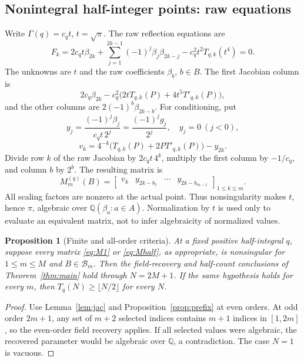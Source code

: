 \documentclass[11pt,a4paper]{article}
\newtheorem{proposition}[theorem]{Proposition}
\theoremstyle{definition}\newtheorem{definition}[theorem]{Definition}
\theoremstyle{remark}\newtheorem{remark}[theorem]{Remark}
\newcommand{\Q}{\mathbb Q}\newcommand{\Qb}{\overline{\mathbb Q}}
\begin{document}
\subsection{Nonintegral half-integer points: raw equations}
Write $\Gamma(q)=c_qt$, $t=\sqrt\pi$. The raw reflection equations are
\begin{equation}\label{eq:halfraw}
F_k=2c_qt\beta_{2k}+\sum_{j=1}^{2k-1}(-1)^j\beta_j\beta_{2k-j}
-c_q^2t^2T_{q,k}(t^4)=0.
\end{equation}
The unknowns are $t$ and the raw coefficients $\beta_b$, $b\in B$. The first Jacobian column is
\[
2c_q\beta_{2k}-c_q^2\bigl(2tT_{q,k}(P)+4t^5T'_{q,k}(P)\bigr),
\]
and the other columns are $2(-1)^b\beta_{2k-b}$. For conditioning, put
\[
y_j=\frac{(-1)^j\beta_j}{c_qt\,2^j}=\frac{(-1)^jg_j}{2^j},\quad
 y_j=0\ (j<0),
\]
\begin{equation}\label{eq:vkhalf}
v_k=4^{-k}\bigl(T_{q,k}(P)+2PT'_{q,k}(P)\bigr)-y_{2k}.
\end{equation}
Divide row $k$ of the raw Jacobian by $2c_qt\,4^k$, multiply the first column by $-1/c_q$, and column $b$ by $2^b$. The resulting matrix is
\begin{equation}\label{eq:Mhalf}
M_m^{(q)}(B)=\left[\begin{array}{c|ccc}
v_k&y_{2k-b_1}&\cdots&y_{2k-b_{m-1}}
\end{array}\right]_{1\le k\le m}.
\end{equation}
All scaling factors are nonzero at the actual point. Thus nonsingularity makes $t$, hence $\pi$, algebraic over $\Q(\beta_a:a\in A)$. Normalization by $t$ is used only to evaluate an equivalent matrix, not to infer algebraicity of normalized values.

\begin{proposition}[Finite and all-order criteria]\label{prop:criterion}
At a fixed positive half-integral $q$, suppose every matrix \eqref{eq:M1} or \eqref{eq:Mhalf}, as appropriate, is nonsingular for $1\le m\le M$ and $B\in\mathcal B_m$. Then the field-recovery and half-count conclusions of Theorem~\ref{thm:main} hold through $N=2M+1$. If the same hypothesis holds for every $m$, then $T_q(N)\ge\lfloor N/2\rfloor$ for every $N$.
\end{proposition}
\begin{proof}
Use Lemma~\ref{lem:jac} and Proposition~\ref{prop:prefix} at even orders. At odd order $2m+1$, any set of $m+2$ selected indices contains $m+1$ indices in $[1,2m]$, so the even-order field recovery applies. If all selected values were algebraic, the recovered parameter would be algebraic over $\Q$, a contradiction. The case $N=1$ is vacuous.
\end{proof}
\end{document}
